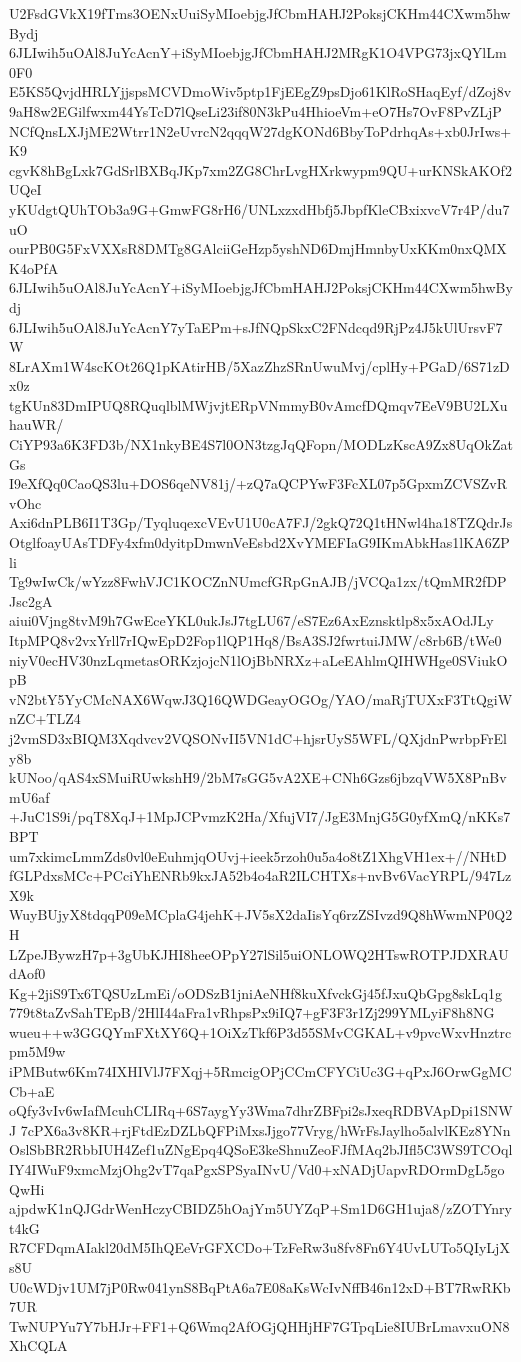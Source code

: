 U2FsdGVkX19fTms3OENxUuiSyMIoebjgJfCbmHAHJ2PoksjCKHm44CXwm5hwBydj
6JLIwih5uOAl8JuYcAcnY+iSyMIoebjgJfCbmHAHJ2MRgK1O4VPG73jxQYlLm0F0
E5KS5QvjdHRLYjjspsMCVDmoWiv5ptp1FjEEgZ9psDjo61KlRoSHaqEyf/dZoj8v
9aH8w2EGilfwxm44YsTcD7lQseLi23if80N3kPu4HhioeVm+eO7Hs7OvF8PvZLjP
NCfQnsLXJjME2Wtrr1N2eUvrcN2qqqW27dgKONd6BbyToPdrhqAs+xb0JrIws+K9
cgvK8hBgLxk7GdSrlBXBqJKp7xm2ZG8ChrLvgHXrkwypm9QU+urKNSkAKOf2UQeI
yKUdgtQUhTOb3a9G+GmwFG8rH6/UNLxzxdHbfj5JbpfKleCBxixvcV7r4P/du7uO
ourPB0G5FxVXXsR8DMTg8GAlciiGeHzp5yshND6DmjHmnbyUxKKm0nxQMXK4oPfA
6JLIwih5uOAl8JuYcAcnY+iSyMIoebjgJfCbmHAHJ2PoksjCKHm44CXwm5hwBydj
6JLIwih5uOAl8JuYcAcnY7yTaEPm+sJfNQpSkxC2FNdcqd9RjPz4J5kUlUrsvF7W
8LrAXm1W4scKOt26Q1pKAtirHB/5XazZhzSRnUwuMvj/cplHy+PGaD/6S71zDx0z
tgKUn83DmIPUQ8RQuqlblMWjvjtERpVNmmyB0vAmcfDQmqv7EeV9BU2LXuhauWR/
CiYP93a6K3FD3b/NX1nkyBE4S7l0ON3tzgJqQFopn/MODLzKscA9Zx8UqOkZatGs
I9eXfQq0CaoQS3lu+DOS6qeNV81j/+zQ7aQCPYwF3FcXL07p5GpxmZCVSZvRvOhc
Axi6dnPLB6I1T3Gp/TyqluqexcVEvU1U0cA7FJ/2gkQ72Q1tHNwl4ha18TZQdrJs
OtglfoayUAsTDFy4xfm0dyitpDmwnVeEsbd2XvYMEFIaG9IKmAbkHas1lKA6ZPli
Tg9wIwCk/wYzz8FwhVJC1KOCZnNUmcfGRpGnAJB/jVCQa1zx/tQmMR2fDPJsc2gA
aiui0Vjng8tvM9h7GwEceYKL0ukJsJ7tgLU67/eS7Ez6AxEznsktlp8x5xAOdJLy
ItpMPQ8v2vxYrll7rIQwEpD2Fop1lQP1Hq8/BsA3SJ2fwrtuiJMW/c8rb6B/tWe0
niyV0ecHV30nzLqmetasORKzjojcN1lOjBbNRXz+aLeEAhlmQIHWHge0SViukOpB
vN2btY5YyCMcNAX6WqwJ3Q16QWDGeayOGOg/YAO/maRjTUXxF3TtQgiWnZC+TLZ4
j2vmSD3xBIQM3Xqdvcv2VQSONvII5VN1dC+hjsrUyS5WFL/QXjdnPwrbpFrEly8b
kUNoo/qAS4xSMuiRUwkshH9/2bM7sGG5vA2XE+CNh6Gzs6jbzqVW5X8PnBvmU6af
+JuC1S9i/pqT8XqJ+1MpJCPvmzK2Ha/XfujVI7/JgE3MnjG5G0yfXmQ/nKKs7BPT
um7xkimcLmmZds0vl0eEuhmjqOUvj+ieek5rzoh0u5a4o8tZ1XhgVH1ex+//NHtD
fGLPdxsMCc+PCciYhENRb9kxJA52b4o4aR2ILCHTXs+nvBv6VacYRPL/947LzX9k
WuyBUjyX8tdqqP09eMCplaG4jehK+JV5sX2daIisYq6rzZSIvzd9Q8hWwmNP0Q2H
LZpeJBywzH7p+3gUbKJHI8heeOPpY27lSil5uiONLOWQ2HTswROTPJDXRAUdAof0
Kg+2jiS9Tx6TQSUzLmEi/oODSzB1jniAeNHf8kuXfvckGj45fJxuQbGpg8skLq1g
779t8taZvSahTEpB/2HlI44aFra1vRhpsPx9iIQ7+gF3F3r1Zj299YMLyiF8h8NG
wueu++w3GGQYmFXtXY6Q+1OiXzTkf6P3d55SMvCGKAL+v9pvcWxvHnztrcpm5M9w
iPMButw6Km74IXHIVlJ7FXqj+5RmcigOPjCCmCFYCiUc3G+qPxJ6OrwGgMCCb+aE
oQfy3vIv6wIafMcuhCLIRq+6S7aygYy3Wma7dhrZBFpi2sJxeqRDBVApDpi1SNWJ
7cPX6a3v8KR+rjFtdEzDZLbQFPiMxsJjgo77Vryg/hWrFsJaylho5alvlKEz8YNn
OslSbBR2RbbIUH4Zef1uZNgEpq4QSoE3keShnuZeoFJfMAq2bJIfl5C3WS9TCOql
IY4IWuF9xmcMzjOhg2vT7qaPgxSPSyaINvU/Vd0+xNADjUapvRDOrmDgL5goQwHi
ajpdwK1nQJGdrWenHczyCBIDZ5hOajYm5UYZqP+Sm1D6GH1uja8/zZOTYnryt4kG
R7CFDqmAIakl20dM5IhQEeVrGFXCDo+TzFeRw3u8fv8Fn6Y4UvLUTo5QIyLjXs8U
U0cWDjv1UM7jP0Rw041ynS8BqPtA6a7E08aKsWcIvNffB46n12xD+BT7RwRKb7UR
TwNUPYu7Y7bHJr+FF1+Q6Wmq2AfOGjQHHjHF7GTpqLie8IUBrLmavxuON8XhCQLA
